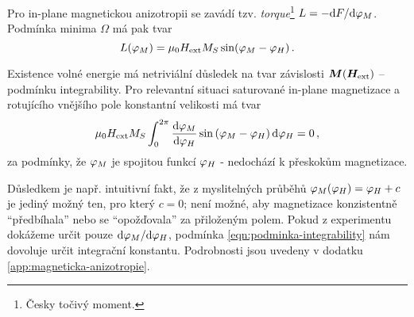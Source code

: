 Pro in-plane magnetickou anizotropii se zavádí tzv. \emph{torque}\footnote{Česky točivý moment.} $L=-\textrm{d}F/\textrm{d}\varphi_M$.
Podmínka minima $\Omega$ má pak tvar
\begin{equation}
    \label{eqn:torque}
    L(\varphi_M) = \mu_0H_\textrm{ext} M_S \sin (\varphi_M-\varphi_H) \,.
\end{equation}

Existence volné energie má netriviální důsledek na tvar závislosti $\bm{M}(\bm{H}_\textrm{ext})$ -- podmínku integrability.
Pro relevantní situaci saturované in-plane magnetizace a rotujícího vnějšího pole konstantní velikosti má tvar
\begin{equation}
\label{eqn:podminka-integrability}
    \mu_0H_\textrm{ext} M_S \int_{0}^{2\pi}  \frac{\text{d}\varphi_M}{\text{d}\varphi_H} \sin\left(\varphi_M-\varphi_H\right) \text{d}\varphi_H=0 \,,
\end{equation}
za podmínky, že $\varphi_M$ je spojitou funkcí $\varphi_H$ - nedochází k přeskokům magnetizace.

Důsledkem je např. intuitivní fakt, že z myslitelných průběhů $\varphi_M(\varphi_H)=\varphi_H+c$ je jediný možný ten, pro který $c=0$;
není možné, aby magnetizace konzistentně ``předbíhala'' nebo se ``opožďovala'' za přiloženým polem.
Pokud z experimentu dokážeme určit pouze $\text{d}\varphi_M/\text{d}\varphi_H$, podmínka \eqref{eqn:podminka-integrability} nám dovoluje určit integrační konstantu.
Podrobnosti jsou uvedeny v dodatku \ref{app:magneticka-anizotropie}.
